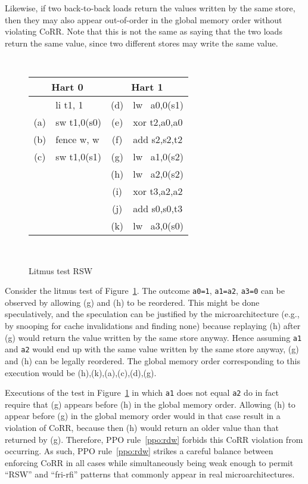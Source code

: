 Likewise, if two back-to-back loads return the values written by the same store, then they may also appear out-of-order in the global memory order without violating CoRR.  Note that this is not the same as saying that the two loads return the same value, since two different stores may write the same value.

\begin{figure}[h!]
  \centering
  {
    \tt\small
    \begin{tabular}{cl||cl}
    \multicolumn{2}{c}{Hart 0} & \multicolumn{2}{c}{Hart 1} \\
    \hline
          & li t1, 1    & (d) & lw~ a0,0(s1) \\
      (a) & sw t1,0(s0) & (e) & xor t2,a0,a0 \\
      (b) & fence w, w  & (f) & add s2,s2,t2 \\
      (c) & sw t1,0(s1) & (g) & lw~ a1,0(s2) \\
          &             & (h) & lw~ a2,0(s2) \\
          &             & (i) & xor t3,a2,a2 \\
          &             & (j) & add s0,s0,t3 \\
          &             & (k) & lw~ a3,0(s0) \\
    \end{tabular}
  }
  ~~~~
  \diagram
  \caption{Litmus test RSW}
  \label{fig:litmus:rsw}
\end{figure}

Consider the litmus test of Figure~\ref{fig:litmus:rsw}.
The outcome {\tt a0=1}, {\tt a1=a2}, {\tt a3=0} can be observed by allowing (g) and (h) to be reordered.  This might be done speculatively, and the speculation can be justified by the microarchitecture (e.g., by snooping for cache invalidations and finding none) because replaying (h) after (g) would return the value written by the same store anyway.
Hence assuming {\tt a1} and {\tt a2} would end up with the same value written by the same store anyway, (g) and (h) can be legally reordered.
The global memory order corresponding to this execution would be (h),(k),(a),(c),(d),(g).

Executions of the test in Figure~\ref{fig:litmus:rsw} in which {\tt a1} does not equal {\tt a2} do in fact require that (g) appears before (h) in the global memory order.
Allowing (h) to appear before (g) in the global memory order would in that case result in a violation of CoRR, because then (h) would return an older value than that returned by (g).
Therefore, PPO rule~\ref{ppo:rdw} forbids this CoRR violation from occurring.
As such, PPO rule~\ref{ppo:rdw} strikes a careful balance between enforcing CoRR in all cases while simultaneously being weak enough to permit ``RSW'' and ``fri-rfi'' patterns that commonly appear in real microarchitectures.

